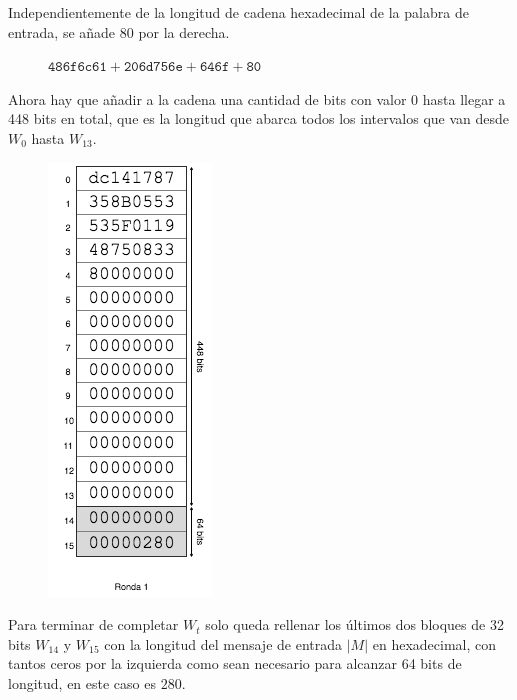 \documentclass{article}
\begin{document}
    Independientemente de la longitud de cadena hexadecimal de la palabra de entrada, se añade $80$ por la derecha.
        \begin{figure}[H]
        \centering
            $\texttt{486f6c61} + \texttt{206d756e} + \texttt{646f} + \texttt{80}$
        \end{figure}
     Ahora hay que añadir a la cadena una cantidad de bits con valor $0$ hasta llegar a 448 bits en total, que es la longitud que abarca todos los intervalos que van desde $W_{0}$ hasta $W_{13}$.
    \begin{figure}[H]
    \centering
        \includegraphics[scale=0.59]{img/Bitcoin_block_SHA_256_W0_W15_ronda_1}
    \end{figure}
    Para terminar de completar $W_{t}$ solo queda rellenar los últimos dos bloques de 32 bits $W_{14}$ y $W_{15}$ con la longitud del mensaje de entrada $|M|$ en hexadecimal, con tantos ceros por la izquierda como sean necesario para alcanzar 64 bits de longitud, en este caso es $280$.
    
\end{document}
